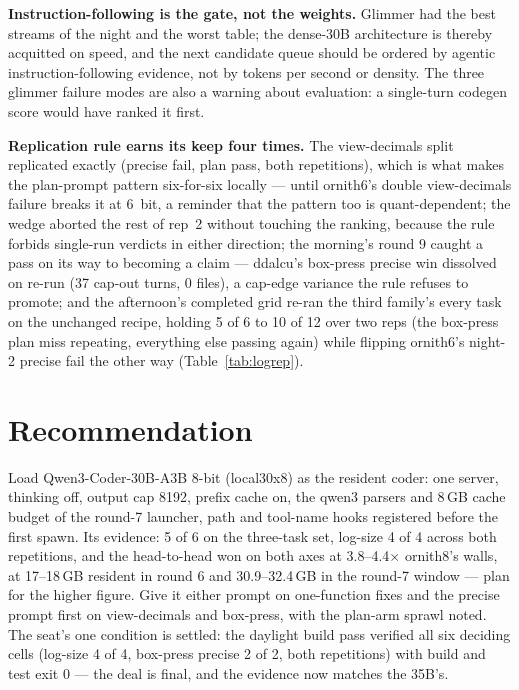 \textbf{Instruction-following is the gate, not the weights.} Glimmer had the best streams of the night and the
worst table; the dense-30B architecture is thereby acquitted on speed, and the next candidate queue should be
ordered by agentic instruction-following evidence, not by tokens per second or density. The three glimmer failure
modes are also a warning about evaluation: a single-turn codegen score would have ranked it first.

\textbf{Replication rule earns its keep four times.} The view-decimals split replicated exactly (precise fail, plan
pass, both repetitions), which is what makes the plan-prompt pattern six-for-six locally --- until ornith6's
double view-decimals failure breaks it at 6~bit, a reminder that the pattern too is quant-dependent; the
wedge aborted the rest of rep~2 without touching the ranking, because the rule forbids single-run verdicts in
either direction; the morning's round 9 caught a pass on its way to becoming a claim --- ddalcu's
box-press precise win dissolved on re-run (37 cap-out turns, 0 files), a cap-edge variance the rule refuses
to promote; and the afternoon's completed grid re-ran the third family's every task on the unchanged recipe,
holding 5 of 6 to 10 of 12 over two reps (the box-press plan miss repeating, everything else passing again)
while flipping ornith6's night-2 precise fail the other way (Table~\ref{tab:logrep}).

\section{Recommendation}\label{sec:recommendation}

Load Qwen3-Coder-30B-A3B 8-bit (local30x8) as the resident coder: one server, thinking off, output cap 8192,
prefix cache on, the qwen3 parsers and 8\,GB cache budget of the round-7 launcher, path and tool-name hooks
registered before the first spawn. Its evidence: 5 of 6 on the three-task set, log-size 4 of 4 across both
repetitions, and the head-to-head won on both axes at 3.8--4.4$\times$ ornith8's walls, at 17--18\,GB resident
in round 6 and 30.9--32.4\,GB in the round-7 window --- plan for the higher figure. Give it either prompt on
one-function fixes and the precise prompt first on view-decimals and box-press, with the plan-arm sprawl noted.
The seat's one condition is settled: the daylight build pass verified all six deciding cells (log-size 4 of 4,
box-press precise 2 of 2, both repetitions) with build and test exit 0 --- the deal is final, and the evidence
now matches the 35B's.

